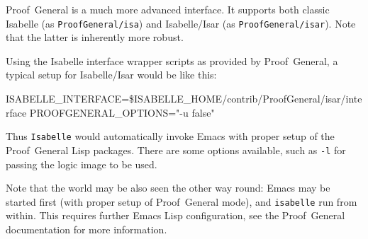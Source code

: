 \medskip Proof~General is a much more
advanced interface.  It supports both classic Isabelle (as
\texttt{ProofGeneral/isa}) and Isabelle/Isar (as \texttt{ProofGeneral/isar}).
Note that the latter is inherently more robust.

Using the Isabelle interface wrapper scripts as provided by Proof~General, a
typical setup for Isabelle/Isar would be like this:
\begin{ttbox}
ISABELLE_INTERFACE=\$ISABELLE_HOME/contrib/ProofGeneral/isar/interface
PROOFGENERAL_OPTIONS="-u false"
\end{ttbox}
Thus \texttt{Isabelle} would automatically invoke Emacs with proper setup of
the Proof~General Lisp packages.  There are some options available, such as
\texttt{-l} for passing the logic image to be used.

\medskip Note that the world may be also seen the other way round: Emacs may
be started first (with proper setup of Proof~General mode), and
\texttt{isabelle} run from within.  This requires further Emacs Lisp
configuration, see the Proof~General documentation \cite{proofgeneral} for
more information.

